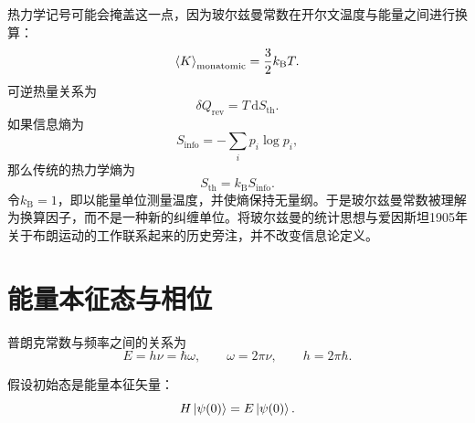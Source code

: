 热力学记号可能会掩盖这一点，因为玻尔兹曼常数在开尔文温度与能量之间进行换算：
\begin{equation}
\left\langle K\right\rangle_{\mathrm{monatomic}}
=\frac32 k_{\mathrm B}T.
\end{equation}
可逆热量关系为
\begin{equation}
\delta Q_{\mathrm{rev}}=T\,\mathrm dS_{\mathrm{th}}.
\end{equation}
如果信息熵为
\begin{equation}
S_{\mathrm{info}}=-\sum_i p_i\log p_i,
\end{equation}
那么传统的热力学熵为
\begin{equation}
S_{\mathrm{th}}=k_{\mathrm B}S_{\mathrm{info}}.
\end{equation}
令\(k_{\mathrm B}=1\)，即以能量单位测量温度，并使熵保持无量纲。于是玻尔兹曼常数被理解为换算因子，而不是一种新的纠缠单位。将玻尔兹曼的统计思想与爱因斯坦1905年关于布朗运动的工作联系起来的历史旁注，并不改变信息论定义。

\section{能量本征态与相位}

\begin{classroomqa}
\end{classroomqa}

普朗克常数与频率之间的关系为
\begin{equation}
E=h\nu=\hbar\omega,
\qquad
\omega=2\pi\nu,
\qquad
h=2\pi\hbar.
\end{equation}

\begin{classroomqa}
\end{classroomqa}

假设初始态是能量本征矢量：
\begin{equation}
H\left\lvert\psi(0)\right\rangle=E\left\lvert\psi(0)\right\rangle.
\end{equation}

